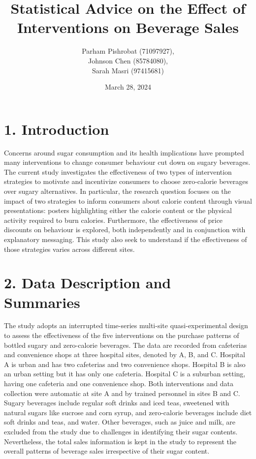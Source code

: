 \documentclass[
]{article}
\title{Statistical Advice on the Effect of Interventions on Beverage Sales}
\author{Parham Pishrobat (71097927),\\
Johnson Chen (85784080),\\
Sarah Masri (97415681)}
\date{March 28, 2024}
\begin{document}
\maketitle

{
\setcounter{tocdepth}{2}
\tableofcontents
}
\pagebreak

\hypertarget{introduction}{%
\section{1. Introduction}\label{introduction}}

Concerns around sugar consumption and its health implications have prompted many interventions to
change consumer behaviour cut down on sugary beverages. The current study investigates the
effectiveness of two types of intervention strategies to motivate and incentivize consumers to
choose zero-calorie beverages over sugary alternatives. In particular, the research question focuses on the impact of two strategies to inform consumers about calorie content through visual
presentations: posters highlighting either the calorie content or the physical activity required to burn calories. Furthermore, the effectiveness of price discounts on behaviour is explored, both independently and in conjunction with explanatory messaging. This study also seek to understand if the effectiveness of those strategies varies across different sites.

\hypertarget{data-description-and-summaries}{%
\section{2. Data Description and Summaries}\label{data-description-and-summaries}}

The study adopts an interrupted time-series multi-site quasi-experimental design to assess the
effectiveness of the five interventions on the purchase patterns of bottled sugary and zero-calorie beverages. The data are recorded from cafeterias and convenience shops at three hospital sites, denoted by A, B, and C. Hospital A is urban and has two cafeterias and two convenience shops. Hospital B is also an urban setting but it has only one cafeteria. Hospital C is a suburban setting, having one cafeteria and one convenience shop. Both interventions and data collection were automatic at site A and by trained personnel in sites B and C. Sugary beverages include regular soft drinks and iced teas, sweetened with natural sugars like sucrose and corn syrup, and zero-calorie beverages include diet soft drinks and teas, and water. Other beverages, such as juice and milk, are excluded from the study due to challenges in identifying their sugar contents. Nevertheless, the total sales information is kept in the study to represent the overall patterns of beverage sales irrespective of their sugar content.
\end{document}

